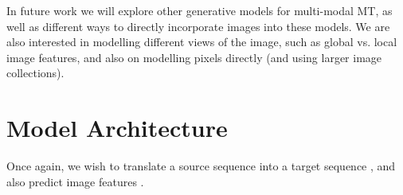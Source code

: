 \documentclass[11pt,a4paper]{article}
\begin{document}
In future work we will explore other generative models for multi-modal MT, as well as different ways to directly incorporate images into these models. We are also interested in modelling different views of the image, such as global vs. local image features, and also on modelling pixels directly (and using larger image collections).
 








\pagebreak
\appendix
\section{Model Architecture}\label{sec:supplementary}
Once again, we wish to translate a source sequence  into a target sequence , and also predict image features .
\end{document}
